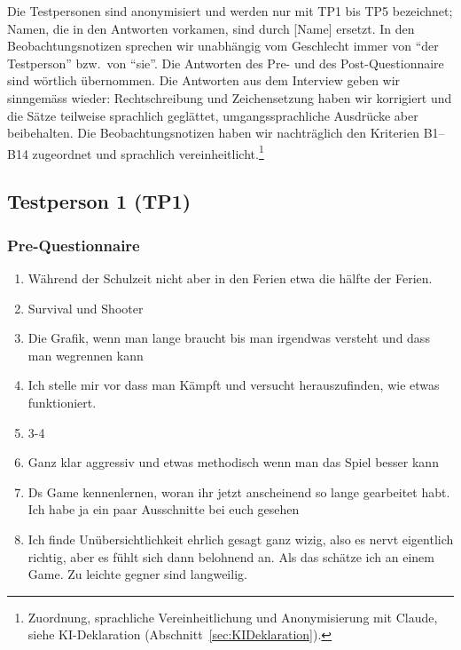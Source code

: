 \documentclass[../Main.tex]{subfiles}
\begin{document}
Die Testpersonen sind anonymisiert und werden nur mit TP1 bis TP5 bezeichnet; Namen, die in den Antworten vorkamen, sind durch [Name] ersetzt. In den Beobachtungsnotizen sprechen wir unabhängig vom Geschlecht immer von \enquote{der Testperson} bzw.\ von \enquote{sie}. Die Antworten des Pre- und des Post-Questionnaire sind wörtlich übernommen. Die Antworten aus dem Interview geben wir sinngemäss wieder: Rechtschreibung und Zeichensetzung haben wir korrigiert und die Sätze teilweise sprachlich geglättet, umgangssprachliche Ausdrücke aber beibehalten. Die Beobachtungsnotizen haben wir nachträglich den Kriterien B1--B14 zugeordnet und sprachlich vereinheitlicht.\footnote{Zuordnung, sprachliche Vereinheitlichung und Anonymisierung mit Claude, siehe KI-Deklaration (Abschnitt~\ref{sec:KIDeklaration}).}

\subsection{Testperson 1 (TP1)}

\subsubsection{Pre-Questionnaire}

\begin{enumerate}[label=\textbf{P\arabic*}, leftmargin=1.5cm, itemsep=0.5em]
    \item Während der Schulzeit nicht aber in den Ferien etwa die hälfte der Ferien.
    \item Survival und Shooter
    \item Die Grafik, wenn man lange braucht bis man irgendwas versteht und dass man wegrennen kann
    \item Ich stelle mir vor dass man Kämpft und versucht herauszufinden, wie etwas funktioniert.
    \item 3-4
    \item Ganz klar aggressiv und etwas methodisch wenn man das Spiel besser kann
    \item Ds Game kennenlernen, woran ihr jetzt anscheinend so lange gearbeitet habt. Ich habe ja ein paar Ausschnitte bei euch gesehen
    \item Ich finde Unübersichtlichkeit ehrlich gesagt ganz wizig, also es nervt eigentlich richtig, aber es fühlt sich dann belohnend an. Als das schätze ich an einem Game. Zu leichte gegner sind langweilig.
\end{enumerate}
\end{document}
